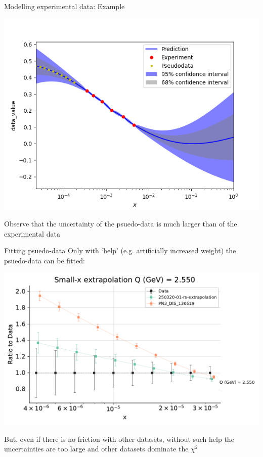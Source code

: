\documentclass[aspectratio=169,11pt]{beamer}
\begin{document}
\begin{frame}[t]{Modelling experimental data: Example}
  \begin{center}
    \includegraphics[height=0.6\textheight]{figures/gp_hera.png}
  \end{center}
  Observe that the uncertainty of the psuedo-data is much larger than of the experimental data
\end{frame}


\begin{frame}[t]{Fitting psuedo-data}
  Only with `help' (e.g. artificially increased weight) the psuedo-data can be fitted:
  \begin{center}
    \includegraphics[height=0.5\textheight]{figures/extradata_fitted.pdf}
  \end{center}
  But, even if there is no friction with other datasets, without such help the uncertainties are too large and other datasets dominate the $\chi^2$
\end{frame}
\end{document}
